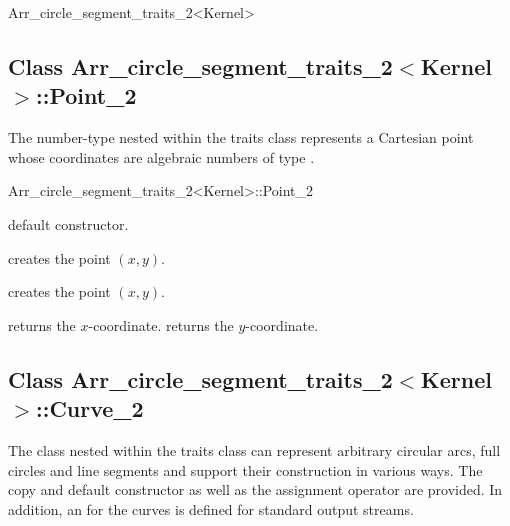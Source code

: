 \begin{ccRefClass}{Arr_circle_segment_traits_2<Kernel>}
\ccIsModel
     \\


\subsection*{Class 
Arr\_circle\_segment\_traits\_2$<$Kernel$>$::Point\_2}

The  number-type nested within the traits class represents
a Cartesian point whose coordinates are algebraic numbers of type
.

\begin{ccClass}{Arr_circle_segment_traits_2<Kernel>::Point_2}

\ccTypes



\ccCreation
{}

    {default constructor.}

    {creates the point $(x,y)$.}

    {creates the point $(x,y)$.}

\ccAccessFunctions

  {returns the $x$-coordinate.}
\ccGlue
{}
  {returns the $y$-coordinate.}

\end{ccClass}

\subsection*{Class 
        Arr\_circle\_segment\_traits\_2$<$Kernel$>$::Curve\_2}

The  class nested within the traits class can represent
arbitrary circular arcs, full circles and line segments and support their
construction in various ways.
The copy and default constructor as well as the assignment operator are
provided. In addition, an  for the curves is defined for
standard output streams.


\end{ccRefClass}
